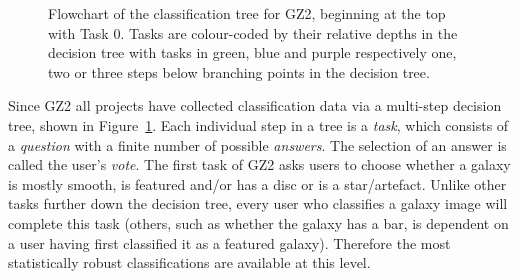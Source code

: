 \begin{figure}
\caption[GZ2 classification decision tree]{Flowchart of the classification tree for GZ2, beginning at the top with Task 0. Tasks are colour-coded by their relative depths in the decision tree with tasks in green, blue and purple respectively one, two or three steps below branching points in the decision tree.}
\label{fig:gztree}
\end{figure}

Since GZ2 all projects have collected classification data via a multi-step decision tree, shown in Figure~\ref{fig:gztree}.  Each individual step in a tree is a \emph{task}, which consists of a \emph{question} with a finite number of possible \emph{answers}. The selection of an answer is called the user's \emph{vote}. The first task of GZ2 asks users to choose whether a galaxy is mostly smooth, is featured and/or has a disc or is a star/artefact. Unlike other tasks further down the decision tree, every user who classifies a galaxy image will complete this task (others, such as whether the galaxy has a bar, is dependent on a user having first classified it as a featured galaxy). Therefore the most statistically robust classifications are available at this level.

